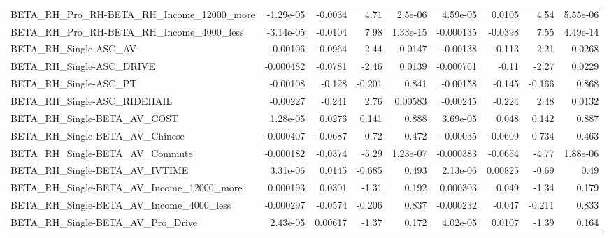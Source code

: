\begin{tabular}{lrrrrrrrr}
BETA\_RH\_Pro\_RH-BETA\_RH\_Income\_12000\_more           &   -1.29e-05 &      -0.0034 &      4.71 &  2.5e-06 &   4.59e-05 &      0.0105 &         4.54 &      5.55e-06 \\
BETA\_RH\_Pro\_RH-BETA\_RH\_Income\_4000\_less            &   -3.14e-05 &      -0.0104 &      7.98 & 1.33e-15 &  -0.000135 &     -0.0398 &         7.55 &      4.49e-14 \\
BETA\_RH\_Single-ASC\_AV                              &    -0.00106 &      -0.0964 &      2.44 &   0.0147 &   -0.00138 &      -0.113 &         2.21 &        0.0268 \\
BETA\_RH\_Single-ASC\_DRIVE                           &   -0.000482 &      -0.0781 &     -2.46 &   0.0139 &  -0.000761 &       -0.11 &        -2.27 &        0.0229 \\
BETA\_RH\_Single-ASC\_PT                              &    -0.00108 &       -0.128 &    -0.201 &    0.841 &   -0.00158 &      -0.145 &       -0.166 &         0.868 \\
BETA\_RH\_Single-ASC\_RIDEHAIL                        &    -0.00227 &       -0.241 &      2.76 &  0.00583 &   -0.00245 &      -0.224 &         2.48 &        0.0132 \\
BETA\_RH\_Single-BETA\_AV\_COST                        &    1.28e-05 &       0.0276 &     0.141 &    0.888 &   3.69e-05 &       0.048 &        0.142 &         0.887 \\
BETA\_RH\_Single-BETA\_AV\_Chinese                     &   -0.000407 &      -0.0687 &      0.72 &    0.472 &   -0.00035 &     -0.0609 &        0.734 &         0.463 \\
BETA\_RH\_Single-BETA\_AV\_Commute                     &   -0.000182 &      -0.0374 &     -5.29 & 1.23e-07 &  -0.000383 &     -0.0654 &        -4.77 &      1.88e-06 \\
BETA\_RH\_Single-BETA\_AV\_IVTIME                      &    3.31e-06 &       0.0145 &    -0.685 &    0.493 &   2.13e-06 &     0.00825 &        -0.69 &          0.49 \\
BETA\_RH\_Single-BETA\_AV\_Income\_12000\_more           &    0.000193 &       0.0301 &     -1.31 &    0.192 &   0.000303 &       0.049 &        -1.34 &         0.179 \\
BETA\_RH\_Single-BETA\_AV\_Income\_4000\_less            &   -0.000297 &      -0.0574 &    -0.206 &    0.837 &  -0.000232 &      -0.047 &       -0.211 &         0.833 \\
BETA\_RH\_Single-BETA\_AV\_Pro\_Drive                   &    2.43e-05 &      0.00617 &     -1.37 &    0.172 &   4.02e-05 &      0.0107 &        -1.39 &         0.164 \\

\end{tabular}
